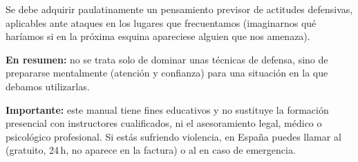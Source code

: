 Se debe adquirir paulatinamente un pensamiento previsor de actitudes defensivas, aplicables ante ataques en los lugares que frecuentamos (imaginarnos qué haríamos si en la próxima esquina apareciese alguien que nos amenaza).

\textbf{En resumen:} no se trata solo de dominar unas técnicas de defensa, sino de prepararse mentalmente (atención y confianza) para una situación en la que debamos utilizarlas.

\begin{aviso}
\textbf{Importante:} este manual tiene fines educativos y no sustituye la formación presencial con instructores cualificados, ni el asesoramiento legal, médico o psicológico profesional. Si estás sufriendo violencia, en España puedes llamar al  (gratuito, 24\,h, no aparece en la factura) o al  en caso de emergencia.
\end{aviso}

